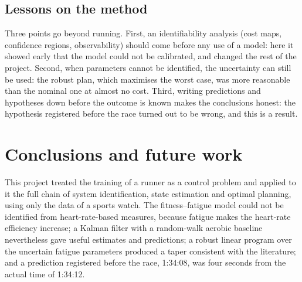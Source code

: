 \documentclass[11pt,a4paper]{article}
\begin{document}
\subsection{Lessons on the method}
Three points go beyond running. First, an identifiability analysis (cost maps,
confidence regions, observability) should come before any use of a model: here it
showed early that the model could not be calibrated, and changed the rest of the
project. Second, when parameters cannot be identified, the uncertainty can still
be used: the robust plan, which maximises the worst case, was more reasonable than
the nominal one at almost no cost. Third, writing predictions and hypotheses down
before the outcome is known makes the conclusions honest: the hypothesis
registered before the race turned out to be wrong, and this is a result.

\section{Conclusions and future work}\label{sec:conclusions}

This project treated the training of a runner as a control problem and applied to
it the full chain of system identification, state estimation and optimal
planning, using only the data of a sports watch. The fitness--fatigue model could
not be identified from heart-rate-based measures, because fatigue makes the
heart-rate efficiency increase; a Kalman filter with a random-walk aerobic
baseline nevertheless gave useful estimates and predictions; a robust linear
program over the uncertain fatigue parameters produced a taper consistent with
the literature; and a prediction registered before the race, 1:34:08, was four
seconds from the actual time of 1:34:12.
\end{document}
